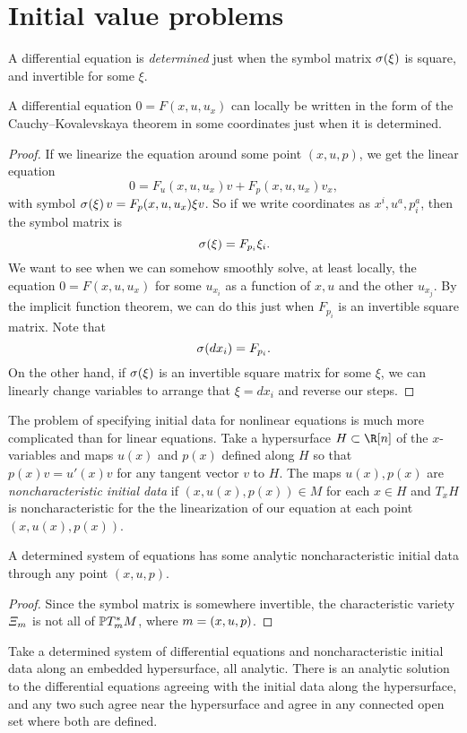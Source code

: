 \section{Initial value problems}
A differential equation is \emph{determined} just when the symbol matrix \(\opsymbol[]{\xi}\) is square, and invertible for some \(\xi\).
\begin{lemma}
A differential equation \(0=F(x,u,u_x)\) can locally be written in the form of the Cauchy--Kovalevskaya theorem in some coordinates just when it is determined.
\end{lemma}
\begin{proof}
If we linearize the equation around some point \((x,u,p)\), we get the linear equation
\[
0=F_u(x,u,u_x)v + F_p(x,u,u_x)v_x,
\]
with symbol \(\opsymbol[]{\xi}v=F_p(x,u,u_x)\xi v\).
So if we write coordinates as \(x^i,u^a,p^a_i\), then the symbol matrix is 
\[
\opsymbol[]{\xi}=F_{p_i}\xi_i.
\]
We want to see when we can somehow smoothly solve, at least locally, the equation \(0=F(x,u,u_x)\) for some \(u_{x_i}\) as a function of \(x,u\) and the other \(u_{x_j}\).
By the implicit function theorem, we can do this just when \(F_{p_i}\) is an invertible square matrix.
Note that
\[
\opsymbol[]{dx_i}=F_{p_i}.
\]
On the other hand, if \(\opsymbol[]{\xi}\) is an invertible square matrix for some \(\xi\), we can linearly change variables to arrange that \(\xi=dx_i\) and reverse our steps.
\end{proof}
The problem of specifying initial data for nonlinear equations is much more complicated than for linear equations.
Take a hypersurface \(H \subset \R[n]\) of the \(x\)-variables and maps \(u(x)\) and \(p(x)\) defined along \(H\) so that \(p(x)v=u'(x)v\) for any tangent vector \(v\) to \(H\).
The maps \(u(x),p(x)\) are \emph{noncharacteristic initial data} if \((x,u(x),p(x)) \in M\) for each \(x \in H\) and \(T_x H\) is noncharacteristic for the the linearization of our equation at each point \((x,u(x),p(x))\).
\begin{lemma}
A determined system of equations has some analytic noncharacteristic initial data through any point \((x,u,p)\).
\end{lemma}
\begin{proof}
Since the symbol matrix is somewhere invertible, the characteristic variety \(\charvariety{m}\) is not all of \(\Proj(T_m^*M)\), where \(m=\left(x,u,p\right)\).
\end{proof}
\begin{theorem}\label{theorem:determined}
Take a determined system of differential equations and noncharacteristic initial data along an embedded hypersurface, all analytic.
There is an analytic solution to the differential equations agreeing with the initial data along the hypersurface, and any two such agree near the hypersurface and agree in any connected open set where both are defined.
\end{theorem}
